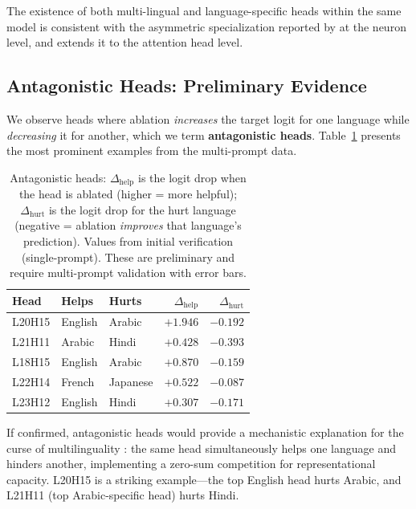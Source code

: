 \documentclass[11pt]{article}
\begin{document}
The existence of both multi-lingual and language-specific heads within the same model is consistent with the asymmetric specialization reported by \citet{crane2026causal} at the neuron level, and extends it to the attention head level.

\subsection{Antagonistic Heads: Preliminary Evidence}
\label{sec:results:antagonistic}

We observe heads where ablation \emph{increases} the target logit for one language while \emph{decreasing} it for another, which we term \textbf{antagonistic heads}.
Table~\ref{tab:antagonistic} presents the most prominent examples from the multi-prompt data.

\begin{table}[t]
\centering
\small
\begin{tabular}{lllrr}
\toprule
\textbf{Head} & \textbf{Helps} & \textbf{Hurts} & $\Delta_{\text{help}}$ & $\Delta_{\text{hurt}}$ \\
\midrule
L20H15 & English & Arabic  & $+1.946$ & $-0.192$ \\
L21H11 & Arabic  & Hindi   & $+0.428$ & $-0.393$ \\
L18H15 & English & Arabic  & $+0.870$ & $-0.159$ \\
L22H14 & French  & Japanese & $+0.522$ & $-0.087$ \\
L23H12 & English & Hindi   & $+0.307$ & $-0.171$ \\
\bottomrule
\end{tabular}
\caption{Antagonistic heads: $\Delta_{\text{help}}$ is the logit drop when the head is ablated (higher = more helpful); $\Delta_{\text{hurt}}$ is the logit drop for the hurt language (negative = ablation \emph{improves} that language's prediction). Values from initial verification (single-prompt). These are preliminary and require multi-prompt validation with error bars.}
\label{tab:antagonistic}
\end{table}

If confirmed, antagonistic heads would provide a mechanistic explanation for the curse of multilinguality \cite{conneau2020unsupervised}: the same head simultaneously helps one language and hinders another, implementing a zero-sum competition for representational capacity.
L20H15 is a striking example---the top English head hurts Arabic, and L21H11 (top Arabic-specific head) hurts Hindi.
\end{document}
